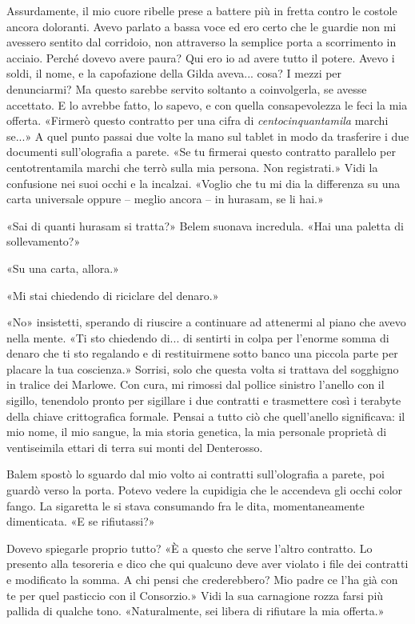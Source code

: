 Assurdamente, il mio cuore ribelle prese a battere più in fretta contro
le costole ancora doloranti. Avevo parlato a bassa voce ed ero certo che
le guardie non mi avessero sentito dal corridoio, non attraverso la
semplice porta a scorrimento in acciaio. Perché dovevo avere paura? Qui
ero io ad avere tutto il potere. Avevo i soldi, il nome, e la
capofazione della Gilda aveva... cosa? I mezzi per denunciarmi? Ma
questo sarebbe servito soltanto a coinvolgerla, se avesse accettato. E
lo avrebbe fatto, lo sapevo, e con quella consapevolezza le feci la mia
offerta. «Firmerò questo contratto per una cifra di
\emph{centocinquantamila} marchi se...» A quel punto passai due volte la
mano sul tablet in modo da trasferire i due documenti sull'olografia a
parete. «Se tu firmerai questo contratto parallelo per centotrentamila
marchi che terrò sulla mia persona. Non registrati.» Vidi la confusione
nei suoi occhi e la incalzai. «Voglio che tu mi dia la differenza su una
carta universale oppure -- meglio ancora -- in hurasam, se li hai.»

«Sai di quanti hurasam si tratta?» Belem suonava incredula. «Hai una
paletta di sollevamento?»

«Su una carta, allora.»

«Mi stai chiedendo di riciclare del denaro.»

«No» insistetti, sperando di riuscire a continuare ad attenermi al piano
che avevo nella mente. «Ti sto chiedendo di... di sentirti in colpa per
l'enorme somma di denaro che ti sto regalando e di restituirmene sotto
banco una piccola parte per placare la tua coscienza.» Sorrisi, solo che
questa volta si trattava del sogghigno in tralice dei Marlowe. Con cura,
mi rimossi dal pollice sinistro l'anello con il sigillo, tenendolo
pronto per sigillare i due contratti e trasmettere così i terabyte della
chiave crittografica formale. Pensai a tutto ciò che quell'anello
significava: il mio nome, il mio sangue, la mia storia genetica, la mia
personale proprietà di ventiseimila ettari di terra sui monti del
Denterosso.

Balem spostò lo sguardo dal mio volto ai contratti sull'olografia a
parete, poi guardò verso la porta. Potevo vedere la cupidigia che le
accendeva gli occhi color fango. La sigaretta le si stava consumando fra
le dita, momentaneamente dimenticata. «E se rifiutassi?»

Dovevo spiegarle proprio tutto? «È a questo che serve l'altro contratto.
Lo presento alla tesoreria e dico che qui qualcuno deve aver violato i
file dei contratti e modificato la somma. A chi pensi che crederebbero?
Mio padre ce l'ha già con te per quel pasticcio con il Consorzio.» Vidi
la sua carnagione rozza farsi più pallida di qualche tono.
«Naturalmente, sei libera di rifiutare la mia offerta.»

